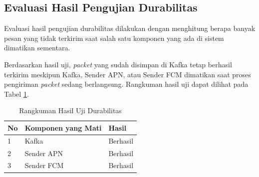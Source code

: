 \subsection{Evaluasi Hasil Pengujian Durabilitas}
\par Evaluasi hasil pengujian durabilitas dilakukan dengan menghitung berapa banyak pesan yang tidak terkirim saat salah satu komponen yang ada di sistem dimatikan sementara.
\par Berdasarkan hasil uji, \textit{packet} yang sudah disimpan di Kafka tetap berhasil terkirim meskipun Kafka, Sender APN, atau Sender FCM dimatikan saat proses pengiriman \textit{packet} sedang berlangsung. Rangkuman hasil uji dapat dilihat pada Tabel \ref{t:rangkuman-durabilitas}.
\clearpage
\begin{longtable}{|p{0.5cm}|p{3.5cm}|p{2cm}|}
	\caption{Rangkuman Hasil Uji Durabilitas} \label{t:rangkuman-durabilitas} \\ \hline
	\rowcolor{lightgray} No & Komponen yang Mati & Hasil \\ \hline 
	1 & Kafka & Berhasil \\ \hline
	2 & Sender APN & Berhasil \\ \hline
	3 & Sender FCM & Berhasil \\ \hline
\end{longtable}
